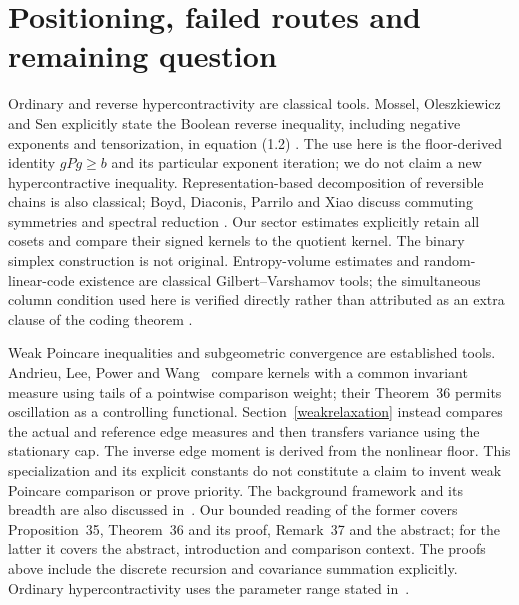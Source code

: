 \documentclass[11pt]{article}
\begin{document}
\section{Positioning, failed routes and remaining question}
Ordinary and reverse hypercontractivity are classical tools. Mossel, Oleszkiewicz and Sen explicitly state the Boolean reverse inequality, including negative exponents and tensorization, in equation (1.2) \cite{mos}. The use here is the floor-derived identity $gPg\geq b$ and its particular exponent iteration; we do not claim a new hypercontractive inequality. Representation-based decomposition of reversible chains is also classical; Boyd, Diaconis, Parrilo and Xiao discuss commuting symmetries and spectral reduction \cite{boyd}. Our sector estimates explicitly retain all cosets and compare their signed kernels to the quotient kernel. The binary simplex construction is not original. Entropy-volume estimates and random-linear-code existence are classical Gilbert--Varshamov tools; the simultaneous column condition used here is verified directly rather than attributed as an extra clause of the coding theorem \cite{guruswami}.

Weak Poincare inequalities and subgeometric convergence are established tools.
Andrieu, Lee, Power and Wang~\cite{alpw2022} compare kernels with a common
invariant measure using tails of a pointwise comparison weight; their
Theorem~36 permits oscillation as a controlling functional. Section~\ref{weakrelaxation}
instead compares the actual and reference edge measures and then transfers
variance using the stationary cap. The inverse edge moment is derived from
the nonlinear floor. This specialization and its explicit constants do not
constitute a claim to invent weak Poincare comparison or prove priority.
The background framework and its breadth are also discussed in~\cite{alpw2023}.
Our bounded reading of the former covers Proposition~35, Theorem~36 and its
proof, Remark~37 and the abstract; for the latter it covers the abstract,
introduction and comparison context. The proofs above include the discrete
recursion and covariance summation explicitly. Ordinary hypercontractivity
uses the parameter range stated in~\cite{odonnelllecture}.
\end{document}

